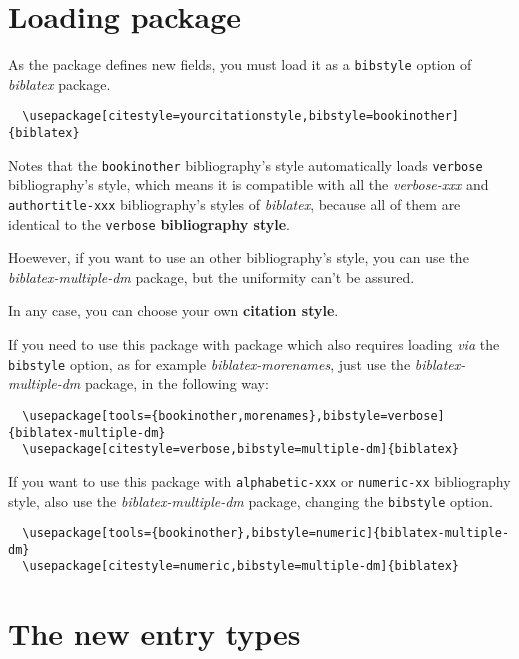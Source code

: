 \documentclass{ltxdockit}[2011/03/25]
\newcommand{\pkg}[1]{\emph{#1}}
\newcommand{\biblatex}{\emph{biblatex}\xspace}
\newcommand{\namebibstyle}[1]{\texttt{#1}}
\begin{document}
\section{Loading package}
As the package defines new fields, you must load it as a \verb+bibstyle+ option of \biblatex package.
 
\begin{verbatim}
  \usepackage[citestyle=yourcitationstyle,bibstyle=bookinother]{biblatex}
\end{verbatim}

Notes that the \namebibstyle{bookinother} bibliography's style automatically loads \namebibstyle{verbose} bibliography's style, which means it is  compatible with all the \emph{verbose-xxx} and \namebibstyle{authortitle-xxx} bibliography's  styles of \biblatex, because all of them are identical to the \namebibstyle{verbose} \textbf{bibliography style}.

Hoewever, if you want to use an other bibliography's style, you can use the \pkg{biblatex-multiple-dm} package, but the uniformity can't be assured.
 
In any case, you can choose your own \textbf{citation style}.
 
\label{morenames}If you need to use this package with package which also requires loading \emph{via} the \verb+bibstyle+ option, as for example \pkg{biblatex-morenames}, just use the \pkg{biblatex-multiple-dm} package, in the following way:

\begin{verbatim}
  \usepackage[tools={bookinother,morenames},bibstyle=verbose]{biblatex-multiple-dm}
  \usepackage[citestyle=verbose,bibstyle=multiple-dm]{biblatex}
\end{verbatim}

If you want to use this package with \namebibstyle{alphabetic-xxx} or \namebibstyle{numeric-xx} bibliography style, also use the \pkg{biblatex-multiple-dm} package, changing the \verb+bibstyle+ option.

\begin{verbatim}
  \usepackage[tools={bookinother},bibstyle=numeric]{biblatex-multiple-dm}
  \usepackage[citestyle=numeric,bibstyle=multiple-dm]{biblatex}
\end{verbatim}

\section{The new entry types}
\end{document}
